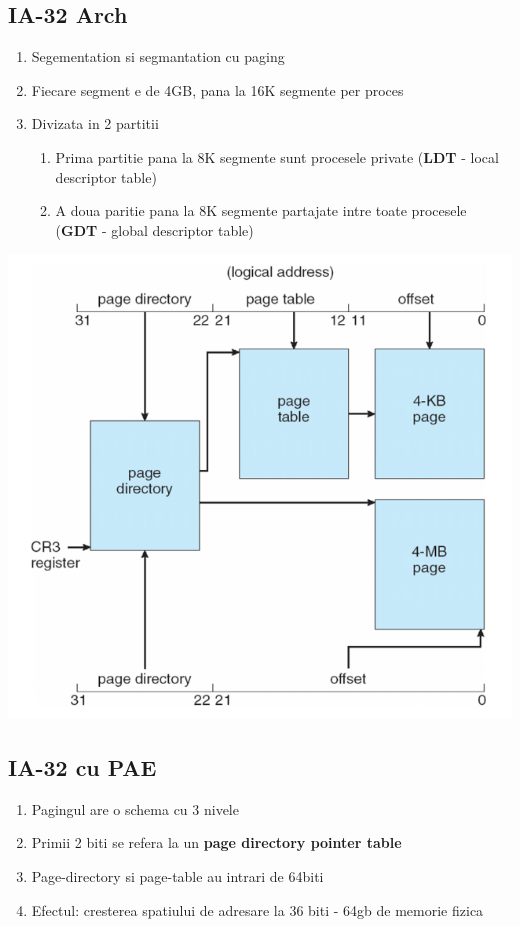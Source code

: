 \documentclass{article}
\begin{document}
\subsection*{IA-32 Arch}
\begin{enumerate}
    \item Segementation si segmantation cu paging
    \item Fiecare segment e de 4GB, pana la 16K segmente per proces
    \item Divizata in 2 partitii
    \begin{enumerate}
        \item Prima partitie pana la 8K segmente sunt procesele private (\textbf{LDT} - local descriptor table)
        \item A doua paritie pana la 8K segmente partajate intre toate procesele (\textbf{GDT} - global descriptor table)
    \end{enumerate}
\end{enumerate}
\begin{center}
    \includegraphics[scale=0.3]{27-32mem.png}
\end{center}

\subsection*{IA-32 cu PAE}
\begin{enumerate}
    \item Pagingul are o schema cu 3 nivele
    \item Primii 2 biti se refera la un \textbf{page directory pointer table}
    \item Page-directory si page-table au intrari de 64biti
    \item Efectul: cresterea spatiului de adresare la 36 biti - 64gb de memorie fizica
\end{enumerate}
\end{document}
